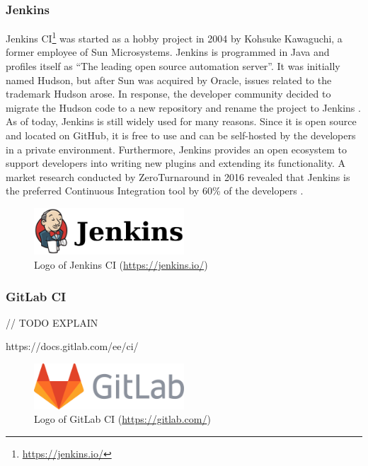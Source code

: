 \subsubsection{Jenkins}
Jenkins CI\footnote{\url{https://jenkins.io/}} was started as a hobby project in 2004 by Kohsuke Kawaguchi, a former employee of Sun Microsystems. Jenkins is programmed in Java and profiles itself as ``The leading open source automation server''. It was initially named Hudson, but after Sun was acquired by Oracle, issues related to the trademark Hudson arose. In response, the developer community decided to migrate the Hudson code to a new repository and rename the project to Jenkins \cite{SmartJenkinsDefinitive}. As of today, Jenkins is still widely used for many reasons. Since it is open source and located on GitHub, it is free to use and can be self-hosted by the developers in a private environment. Furthermore, Jenkins provides an open ecosystem to support developers into writing new plugins and extending its functionality. A market research conducted by ZeroTurnaround in 2016 revealed that Jenkins is the preferred Continuous Integration tool by 60\% of the developers \cite{maple_2016}.

\begin{figure}[htbp!]
	\centering
	\includegraphics[width=0.5\textwidth]{assets/jenkins.pdf}
	\caption{Logo of Jenkins CI (\url{https://jenkins.io/})}
	\label{fig:jenkins}
\end{figure}

\subsubsection{GitLab CI}
// TODO EXPLAIN


https://docs.gitlab.com/ee/ci/

\begin{figure}[htbp!]
	\centering
	\includegraphics[width=0.5\textwidth]{assets/gitlab.pdf}
	\caption{Logo of GitLab CI (\url{https://gitlab.com/})}
	\label{fig:gitlab-ci}
\end{figure}

